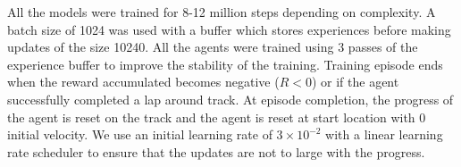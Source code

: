 All the models were trained for 8-12 million steps depending on
complexity. A batch size of 1024 was used with a buffer which stores
experiences before making updates of the size 10240. All the agents
were trained using 3 passes of the experience buffer to improve the
stability of the training. Training episode ends when the reward
accumulated becomes negative ($R < 0$) or if the agent successfully
completed a lap around track. At episode completion, the progress of
the agent is reset on the track and the agent is reset at start
location with 0 initial velocity. We use an initial learning rate of
$3 \times 10^{-2}$ with a linear learning rate scheduler to ensure
that the updates are not to large with the progress.

